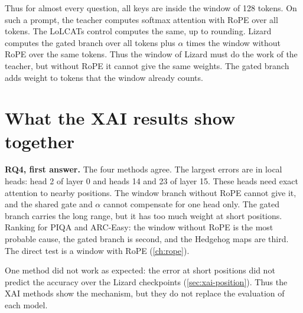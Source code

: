 Thus for almost every question, all keys are inside the window of 128 tokens. On such a prompt, the teacher computes softmax attention with RoPE over all tokens. The LoLCATs control computes the same, up to rounding. Lizard computes the gated branch over all tokens plus $\alpha$ times the window without RoPE over the same tokens. Thus the window of Lizard must do the work of the teacher, but without RoPE it cannot give the same weights. The gated branch adds weight to tokens that the window already counts.

\section{What the XAI results show together}
\label{sec:xai-summary}

\begin{finding}
\textbf{RQ4, first answer.} The four methods agree. The largest errors are in local heads: head 2 of layer 0 and heads 14 and 23 of layer 15. These heads need exact attention to nearby positions. The window branch without RoPE cannot give it, and the shared gate and $\alpha$ cannot compensate for one head only. The gated branch carries the long range, but it has too much weight at short positions. Ranking for PIQA and ARC-Easy: the window without RoPE is the most probable cause, the gated branch is second, and the Hedgehog maps are third. The direct test is a window with RoPE (\cref{ch:rope}).
\end{finding}

One method did not work as expected: the error at short positions did not predict the accuracy over the Lizard checkpoints (\cref{sec:xai-position}). Thus the XAI methods show the mechanism, but they do not replace the evaluation of each model.
